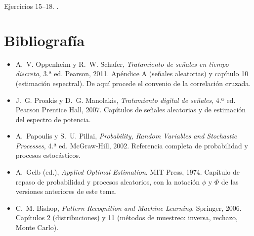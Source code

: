 \documentclass[11pt,a4paper]{scrartcl}
\begin{document}
\begin{flushright}\small\color{pdsgris}Ejercicios 15–18. .\end{flushright}

\section*{Bibliografía}

\begin{itemize}
  \item A.~V. Oppenheim y R.~W. Schafer, \emph{Tratamiento de señales en tiempo discreto}, 3.ª ed. Pearson, 2011. Apéndice A (señales aleatorias) y capítulo 10 (estimación espectral). De aquí procede el convenio de la correlación cruzada.
  \item J.~G. Proakis y D.~G. Manolakis, \emph{Tratamiento digital de señales}, 4.ª ed. Pearson Prentice Hall, 2007. Capítulos de señales aleatorias y de estimación del espectro de potencia.
  \item A.~Papoulis y S.~U. Pillai, \emph{Probability, Random Variables and Stochastic Processes}, 4.ª ed. McGraw-Hill, 2002. Referencia completa de probabilidad y procesos estocásticos.
  \item A.~Gelb (ed.), \emph{Applied Optimal Estimation}. MIT Press, 1974. Capítulo de repaso de probabilidad y procesos aleatorios, con la notación $\phi$ y $\Phi$ de las versiones anteriores de este tema.
  \item C.~M. Bishop, \emph{Pattern Recognition and Machine Learning}. Springer, 2006. Capítulos 2 (distribuciones) y 11 (métodos de muestreo: inversa, rechazo, Monte Carlo).
\end{itemize}
\end{document}
